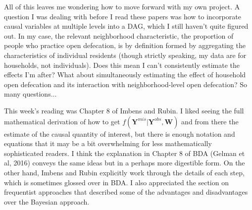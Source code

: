 \documentclass[10pt,a4paper]{article}
\begin{document}
All of this leaves me wondering how to move forward with my own project. A question I was dealing with before I read these papers was how to incorporate causal variables at multiple levels into a DAG, which I still haven't quite figured out. In my case, the relevant neighborhood characteristic, the proportion of people who practice open defecation, is by definition formed by aggregating the characteristics of individual residents (though strictly speaking, my data are for households, not individuals). Does this mean I can't consistently estimate the effects I'm after? What about simultaneously estimating the effect of household open defecation and its interaction with neighborhood-level open defecation? So many questions...

This week's reading was Chapter 8 of Imbens and Rubin. I liked seeing the full mathematical derivation of how to get $f(\mathbf{Y}^{mis}|\mathbf{Y}^{obs}, \mathbf{W})$ and from there the estimate of the causal quantity of interest, but there is enough notation and equations that it may be a bit overwhelming for less mathematically sophisticated readers. I think the explanation in Chapter 8 of BDA (Gelman et al, 2016) conveys the same ideas but in a perhaps more digestible form. On the other hand, Imbens and Rubin explicitly work through the details of each step, which is sometimes glossed over in BDA. I also appreciated the section on frequentist approaches that described some of the advantages and disadvantages over the Bayesian approach.
\end{document}
